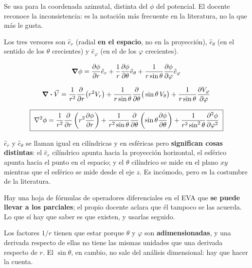 \documentclass[12pt,a4paper]{article}
\begin{document}
\begin{notebox}
Se usa para la coordenada azimutal, distinta del $\phi$ del potencial. El docente
reconoce la inconsistencia: es la notación más frecuente en la literatura, no la
que más le gusta.
\end{notebox}

Los tres versores son $\hat e_r$ (radial \textbf{en el espacio}, no en la
proyección), $\hat e_\theta$ (en el sentido de los $\theta$ crecientes) y
$\hat e_\varphi$ (en el de los $\varphi$ crecientes).

\[
\grad\phi = \pdv{\phi}{r}\hat e_r + \frac{1}{r}\pdv{\phi}{\theta}\hat e_\theta
+ \frac{1}{r\sin\theta}\pdv{\phi}{\varphi}\hat e_\varphi
\]

\[
\div\vec V = \frac{1}{r^2}\pdv{r}\big(r^2 V_r\big)
+ \frac{1}{r\sin\theta}\pdv{\theta}\big(\sin\theta\, V_\theta\big)
+ \frac{1}{r\sin\theta}\pdv{V_\varphi}{\varphi}
\]

\[
\boxed{\;\laplacian\phi = \frac{1}{r^2}\pdv{r}\left(r^2\pdv{\phi}{r}\right)
+ \frac{1}{r^2\sin\theta}\pdv{\theta}\left(\sin\theta\pdv{\phi}{\theta}\right)
+ \frac{1}{r^2\sin^2\theta}\pdv[2]{\phi}{\varphi}\;}
\]

\begin{warnbox}
$\hat e_r$ y $\hat e_\theta$ se llaman igual en cilíndricas y en esféricas pero
\textbf{significan cosas distintas}: el $\hat e_r$ cilíndrico apunta hacia la
proyección horizontal, el esférico apunta hacia el punto en el espacio; y el
$\theta$ cilíndrico se mide en el plano $xy$ mientras que el esférico se mide
desde el eje $z$. Es incómodo, pero es la costumbre de la literatura.
\end{warnbox}

\begin{notebox}
Hay una hoja de fórmulas de operadores diferenciales en el EVA que \textbf{se
puede llevar a los parciales}; el propio docente aclara que él tampoco se las
acuerda. Lo que sí hay que saber es que existen, y usarlas seguido.
\end{notebox}

\begin{notebox}
Los factores $1/r$ tienen que estar porque $\theta$ y $\varphi$ son
\textbf{adimensionadas}, y una derivada respecto de ellas no tiene las mismas
unidades que una derivada respecto de $r$. El $\sin\theta$, en cambio, no sale
del análisis dimensional: hay que hacer la cuenta.
\end{notebox}
\end{document}
